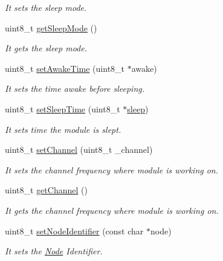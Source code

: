 \begin{DoxyCompactItemize}
\begin{DoxyCompactList}\small\item\em It sets the sleep mode. \end{DoxyCompactList}\item 
uint8\+\_\+t \hyperlink{class_wasp_x_bee_core_ac10025e71ce012499006d8bfaf9cb86e}{get\+Sleep\+Mode} ()
\begin{DoxyCompactList}\small\item\em It gets the sleep mode. \end{DoxyCompactList}\item 
uint8\+\_\+t \hyperlink{class_wasp_x_bee_core_a2787bc9bc3ad984408ef25a7b61275be}{set\+Awake\+Time} (uint8\+\_\+t $\ast$awake)
\begin{DoxyCompactList}\small\item\em It sets the time awake before sleeping. \end{DoxyCompactList}\item 
uint8\+\_\+t \hyperlink{class_wasp_x_bee_core_a5899f0f9a3fd7668c989f76768bbec9b}{set\+Sleep\+Time} (uint8\+\_\+t $\ast$\hyperlink{class_wasp_x_bee_core_a15dbaf3f5f69b1400a4b39b2136c6536}{sleep})
\begin{DoxyCompactList}\small\item\em It sets time the module is slept. \end{DoxyCompactList}\item 
uint8\+\_\+t \hyperlink{class_wasp_x_bee_core_a1570f13364cdeceddd91f0c931569a9b}{set\+Channel} (uint8\+\_\+t \+\_\+channel)
\begin{DoxyCompactList}\small\item\em It sets the channel frequency where module is working on. \end{DoxyCompactList}\item 
uint8\+\_\+t \hyperlink{class_wasp_x_bee_core_a3dc9511964e5057ef3ef8c7537ddcaeb}{get\+Channel} ()
\begin{DoxyCompactList}\small\item\em It gets the channel frequency where module is working on. \end{DoxyCompactList}\item 
uint8\+\_\+t \hyperlink{class_wasp_x_bee_core_a47f7d7d864a1e89bd2c66d6765f08c8e}{set\+Node\+Identifier} (const char $\ast$node)
\begin{DoxyCompactList}\small\item\em It sets the \hyperlink{struct_node}{Node} Identifier. \end{DoxyCompactList}\item 

\end{DoxyCompactItemize}
